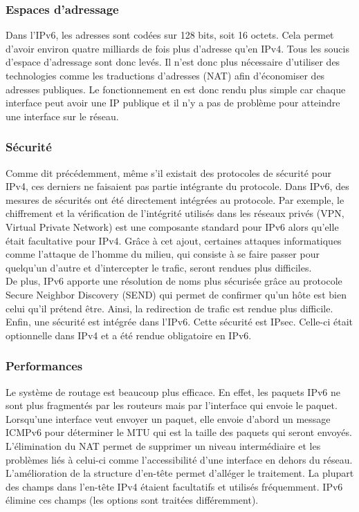 \subsubsection{Espaces d'adressage}
Dans l'IPv6, les adresses sont codées sur 128 bits, soit 16 octets. Cela permet d'avoir 
environ quatre milliards de fois plus d'adresse qu'en IPv4. Tous les soucis d'espace d'adressage sont donc levés. Il n'est donc plus nécessaire d'utiliser des technologies comme les traductions d'adresses
(NAT) afin d'économiser des adresses publiques. Le fonctionnement en est donc rendu plus simple car 
chaque interface peut avoir une IP publique et il n'y a pas de problème pour atteindre une interface sur le réseau.
\subsubsection{Sécurité}
Comme dit précédemment, même s'il existait des protocoles de sécurité pour IPv4, 
ces derniers ne faisaient pas partie intégrante du protocole.
Dans IPv6, des mesures de sécurités ont été directement intégrées au protocole.
Par exemple, le chiffrement et la vérification de l'intégrité utilisés dans les réseaux privés 
(VPN, Virtual Private Network) est une composante standard pour IPv6 alors qu'elle était 
facultative pour IPv4. Grâce à cet ajout, certaines attaques informatiques comme l'attaque de 
l'homme du milieu, qui consiste à se faire passer pour quelqu'un d'autre et d'intercepter 
le trafic, seront rendues plus difficiles.
\\
De plus, IPv6 apporte une résolution de noms plus sécurisée grâce au protocole Secure Neighbor
Discovery (SEND) qui permet de confirmer qu'un hôte est bien celui qu'il prétend être. Ainsi, la redirection de trafic est rendue plus difficile.
\\
Enfin, une sécurité est intégrée dans l'IPv6. Cette sécurité est IPsec. Celle-ci était optionnelle 
dans IPv4 et a été rendue obligatoire en IPv6.
\subsubsection{Performances}

Le système de routage est beaucoup plus efficace. En effet, les paquets IPv6 ne sont plus
fragmentés par les routeurs mais par l'interface qui envoie le paquet. Lorsqu'une interface
veut envoyer un paquet, elle envoie d'abord un message ICMPv6 pour déterminer le MTU qui est 
la taille des paquets qui seront envoyés.
\\
L'élimination du NAT permet de supprimer un niveau intermédiaire et les problèmes liés à celui-ci
 comme l'accessibilité d'une interface en dehors du réseau.
\\	
L'amélioration de la structure d'en-tête permet d'alléger le traitement. La
plupart des champs dans l'en-tête IPv4 étaient facultatifs et utilisés
fréquemment. IPv6 élimine ces champs (les options sont traitées différemment).
